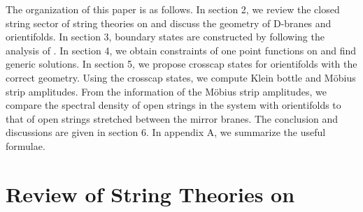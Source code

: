 \documentclass[a4paper,12pt]{article}
\providecommand{\brp}{{\mathbb R \mathbb P}^2}
\begin{document}
The organization of this paper is as follows. 
In section 2, we review the closed string sector of string theories on
\coordHE{} and discuss the geometry of D-branes and orientifolds.  
In section 3, boundary states are constructed by following the
analysis of \cite{LOP,PST}. 
In section 4, we obtain constraints of one point functions on
\myHighlight{$\brp$}\coordHE{} and find generic solutions. 
In section 5, we propose crosscap states for orientifolds with
the correct geometry.  Using the crosscap states, 
we compute Klein bottle and M\"{o}bius strip amplitudes.
From the information of the M\"{o}bius strip amplitudes, we
compare the spectral density of open strings in the system with
orientifolds to that of open strings
stretched between the mirror branes.
The conclusion and discussions are given in section 6.
In appendix A, we summarize the useful formulae.


\section{Review of String Theories on \coordHE{}}
\indent
\end{document}
